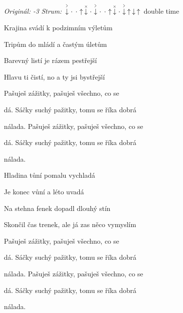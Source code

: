 \begin{song}


\begin{headerbox}
\RaiseBoxWithAccents
\textit{Originál: -3} \quad
\textit{Strum:} $\AccentDown\Miss\Miss\Up\ChuckDown\Miss\AccentDown\Miss\Miss\Up\ChuckDown\Miss\AccentDown\Up\Down\Up$ double time
\end{headerbox}

\begin{vchordbox}
\end{vchordbox}

\Large

\bigskip

\Intro
{}    \par

\bigskip

Krajina svádí k podzimním výletům \par
Tripům do mládí a častým úletům \par
Barevný listí je rázem pestřejší \par
Hlavu ti čistí, no a ty jsi bystřejší \par

\bigskip

 Pašuješ zážitky, pašuješ všechno, co se \par
{}dá. Sáčky suchý pažitky, tomu se říka dobrá \par
nálada. Pašuješ zážitky, pašuješ všechno, co se \par
{}dá. Sáčky suchý pažitky, tomu se říka dobrá \par
nálada.    \par

\bigskip

Hladina tůní pomalu vychladá \par
Je konec vůní a léto uvadá \par
Na stehna fenek dopadl dlouhý stín \par
Skončil čas trenek, ale já zas něco vymyslím \par

\bigskip

 Pašuješ zážitky, pašuješ všechno, co se \par
{}dá. Sáčky suchý pažitky, tomu se říka dobrá \par
nálada. Pašuješ zážitky, pašuješ všechno, co se \par
{}dá. Sáčky suchý pažitky, tomu se říka dobrá \par
nálada.    \par
{}    \par


\end{song}
